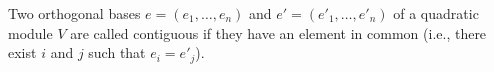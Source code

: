 Two orthogonal bases $e = (e_1, \ldots, e_n)$ and $e' = (e'_1, \ldots, e'_n)$ of a quadratic module $V$ are called contiguous if they have an element in common (i.e., there exist $i$ and $j$ such that $e_i = e'_j$).
